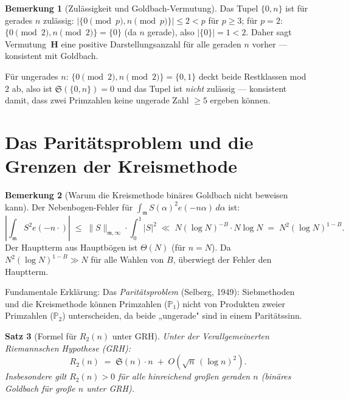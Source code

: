 \documentclass[12pt,a4paper]{amsart}
\newtheorem{theorem}{Satz}[section]
\theoremstyle{definition}
\newtheorem{bemerkung}[theorem]{Bemerkung}
\newcommand{\eq}[1]{e\!\left(#1\right)}
\begin{document}
\begin{bemerkung}[Zulässigkeit und Goldbach-Vermutung]
  Das Tupel $\{0, n\}$ ist für gerades $n$ zulässig:
  $|\{0 \pmod p, n \pmod p\}| \leq 2 < p$ für $p \geq 3$;
  für $p=2$: $\{0 \pmod 2, n \pmod 2\} = \{0\}$ (da $n$ gerade), also $|\{0\}|=1<2$.
  Daher sagt Vermutung~$\mathbf{H}$ eine positive Darstellungsanzahl für
  alle geraden $n$ vorher — konsistent mit Goldbach.

  Für ungerades $n$: $\{0 \pmod 2, n \pmod 2\} = \{0,1\}$ deckt beide
  Restklassen mod $2$ ab, also ist $\mathfrak{S}(\{0,n\}) = 0$ und das
  Tupel ist \emph{nicht} zulässig — konsistent damit, dass zwei Primzahlen
  keine ungerade Zahl $\geq 5$ ergeben können.
\end{bemerkung}

\section{Das Paritätsproblem und die Grenzen der Kreismethode}
\label{sec:paritaet}

\begin{bemerkung}[Warum die Kreismethode binäres Goldbach nicht beweisen kann]
  Der Nebenbogen-Fehler für $\int_{\mathfrak{m}} S(\alpha)^2 \eq{-n\alpha}\, d\alpha$
  ist:
  \[
    \left|\int_{\mathfrak{m}} S^2 \eq{-n\cdot}\right|
    \;\leq\; \|S\|_{\mathfrak{m},\infty} \cdot \int_0^1 |S|^2
    \;\ll\; N(\log N)^{-B} \cdot N\log N
    \;=\; N^2 (\log N)^{1-B}.
  \]
  Der Hauptterm aus Hauptbögen ist $\Theta(N)$ (für $n = N$).  Da
  $N^2 (\log N)^{1-B} \gg N$ für alle Wahlen von $B$, überwiegt
  der Fehler den Hauptterm.

  Fundamentale Erklärung: Das \emph{Paritätsproblem} (Selberg, 1949):
  Siebmethoden und die Kreismethode können Primzahlen ($\mathbb{P}_1$)
  nicht von Produkten zweier Primzahlen ($\mathbb{P}_2$) unterscheiden,
  da beide „ungerade" sind in einem Paritätssinn.
\end{bemerkung}

\begin{theorem}[Formel für $R_2(n)$ unter GRH]\label{thm:R2_GRH}
  Unter der Verallgemeinerten Riemannschen Hypothese (GRH):
  \[
    R_2(n) \;=\; \mathfrak{S}(n) \cdot n \;+\; O\!\left(\sqrt{n}\, (\log n)^2\right).
  \]
  Insbesondere gilt $R_2(n) > 0$ für alle hinreichend großen geraden $n$
  (binäres Goldbach für große $n$ unter GRH).
\end{theorem}
\end{document}
